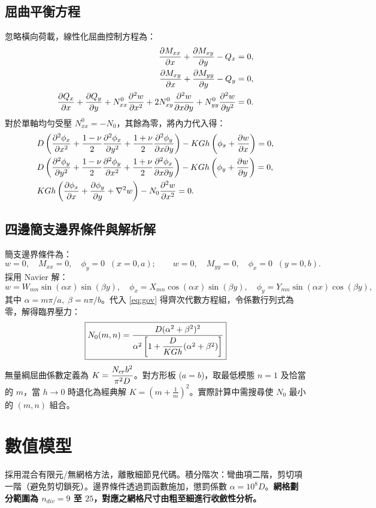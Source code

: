 \subsection{屈曲平衡方程}
忽略橫向荷載，線性化屈曲控制方程為：
\begin{align}
\pdv{M_{xx}}{x} + \pdv{M_{xy}}{y} - Q_x &= 0, \notag\\
\pdv{M_{xy}}{x} + \pdv{M_{yy}}{y} - Q_y &= 0, \label{eq:eqm}\\
\pdv{Q_x}{x} + \pdv{Q_y}{y} + N_{xx}^0 \pdv[2]{w}{x} + 2N_{xy}^0 \pdv{w}{x}{y} + N_{yy}^0 \pdv[2]{w}{y} &= 0. \notag
\end{align}
對於單軸均勻受壓 \(N_{xx}^0 = -N_0\)，其餘為零，將內力代入得：
\begin{align}
&D\left(\pdv[2]{\phi_x}{x} + \frac{1-\nu}{2}\pdv[2]{\phi_x}{y} + \frac{1+\nu}{2}\pdv{\phi_y}{x}{y}\right) - K G h\left(\phi_x + \pdv{w}{x}\right) = 0, \notag\\
&D\left(\pdv[2]{\phi_y}{y} + \frac{1-\nu}{2}\pdv[2]{\phi_y}{x} + \frac{1+\nu}{2}\pdv{\phi_x}{x}{y}\right) - K G h\left(\phi_y + \pdv{w}{y}\right) = 0, \notag\\
&K G h\left(\pdv{\phi_x}{x} + \pdv{\phi_y}{y} + \nabla^2 w\right) - N_0 \pdv[2]{w}{x} = 0. \label{eq:gov}
\end{align}

\subsection{四邊簡支邊界條件與解析解}
簡支邊界條件為：
\[
w = 0,\quad M_{xx}=0,\quad \phi_y=0 \;\; (x=0,a); \qquad
w = 0,\quad M_{yy}=0,\quad \phi_x=0 \;\; (y=0,b).
\]
採用 Navier 解：
\[
w = W_{mn}\sin(\alpha x)\sin(\beta y),\quad
\phi_x = X_{mn}\cos(\alpha x)\sin(\beta y),\quad
\phi_y = Y_{mn}\sin(\alpha x)\cos(\beta y),
\]
其中 \(\alpha=m\pi/a,\;\beta=n\pi/b\)。代入 \eqref{eq:gov} 得齊次代數方程組，令係數行列式為零，解得臨界壓力：
\begin{equation}
\boxed{N_0(m,n) = \frac{D(\alpha^2+\beta^2)^2}
{\alpha^2\left[1 + \dfrac{D}{K G h}(\alpha^2+\beta^2)\right]}} \label{eq:Ncr_ssss}
\end{equation}
無量綱屈曲係數定義為 \(K = \dfrac{N_{cr} b^2}{\pi^2 D}\)。對方形板 (\(a=b\))，取最低模態 \(n=1\) 及恰當的 \(m\)，當 \(h\to 0\) 時退化為經典解 \(K = \left(m + \frac{1}{m}\right)^2\)。實際計算中需搜尋使 \(N_0\) 最小的 \((m,n)\) 組合。

\section{數值模型}
採用混合有限元/無網格方法，離散細節見代碼。積分階次：彎曲項二階，剪切項一階（避免剪切鎖死）。邊界條件透過罰函數施加，懲罰係數 \(\alpha = 10^8 D\)。\textbf{網格劃分範圍為 \(n_{div} = 9\) 至 \(25\)，對應之網格尺寸由粗至細進行收斂性分析。}


